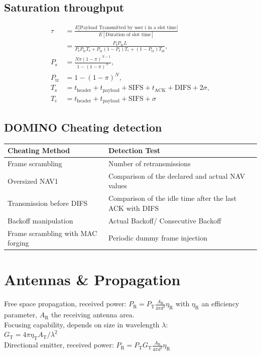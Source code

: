 \documentclass[6pt]{scrartcl}
\begin{document}
\begin{multicols}{4}
\subsection{Saturation throughput}

\begin{align*}
 \tau &= \frac{E\lbrack\textrm{Payload Transmitted by user i in a slot time}\rbrack}{E[\textrm{Duration of slot time}]} \\ 
 &= \frac{P_\textrm{s}P_{\textrm{tr}}L}{P_\textrm{s}P_{\textrm{tr}}T_{\textrm{s}} + P_\textrm{tr}(1-P_\textrm{s})T_\textrm{c} + (1-P_\textrm{tr})T_\textrm{id}}, \\
 P_\textrm{s} &= \frac{N\pi (1-\pi)^{N-1}}{1-(1-\pi)^N}, \\
 P_\textrm{tr} &= 1-(1-\pi)^N, \\
 T_\textrm{s} &= t_\textrm{header} + t_\textrm{payload} + \textrm{SIFS} + t_\textrm{ACK} + \textrm{DIFS} + 2\sigma,\\
 T_\textrm{c} &= t_\textrm{header} + t_\textrm{payload} + \textrm{SIFS} + \sigma
\end{align*}

\subsection{DOMINO Cheating detection}
\begin{tabular}{|p{}|p{}|}
  \hline
  Cheating Method & Detection Test \\\hline
  Frame scrambling & Number of retransmissions \\
  Oversized NAV1 & Comparison of the declared and actual NAV values\\
  Transmission before DIFS & Comparison of the idle time after the last ACK with DIFS \\
  Backoff manipulation & Actual Backoff/ Consecutive Backoff \\
  Frame scrambling with MAC forging & Periodic dummy frame injection\\
   \hline
\end{tabular}

\section{Antennas \& Propagation}
Free space propagation, received power: $P_\textrm{R} = P_\textrm{T}\frac{A_\textrm{R}}{4\pi d^2}\eta_\textrm{R}$ with $\eta_\textrm{R}$ an efficiency parameter, $A_\textrm{R}$ the receiving antenna area.
\\
Focusing capability, depends on size in wavelength $\lambda$:  
\\$G_\textrm{T} = 4\pi\eta_\textrm{T}A_\textrm{T}/\lambda^2$ \\
Directional emitter, received power: $P_\textrm{R} = P_\textrm{T}G_\textrm{T}\frac{A_\textrm{R}}{4\pi d^2}\eta_\textrm{R}$


\end{multicols}
\end{document}
